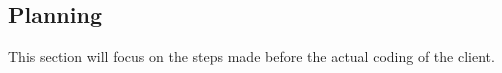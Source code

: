 \subsection{Planning}
This section will focus on the steps made before the actual coding of the client.



\newpage